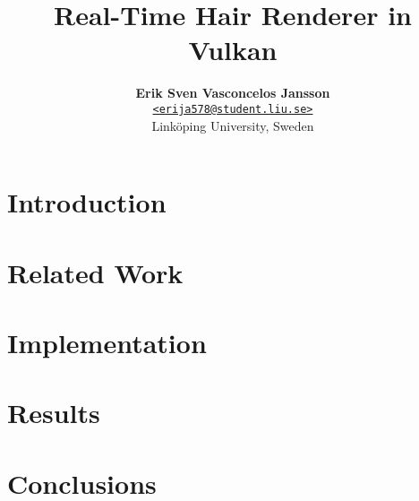 \documentclass[a4paper, twocolumn]{article}
\title{\vspace{-1.5em}\textbf{Real-Time Hair Renderer in Vulkan}}
\author{{\textbf{Erik Sven Vasconcelos Jansson}} \\
        {\href{mailto:erija578@student.liu.se}
        {\texttt{<erija578@student.liu.se>}}} \\
        {Linköping University, Sweden}}
\begin{document}
    \maketitle

    \begin{abstract}  \end{abstract} %
    \section{Introduction} \label{sec:introduction} 
    \section{Related Work} \label{sec:related_work} 
    \section{Implementation} \label{sec:implementation} 
    \section{Results} \label{sec:results} 
    \section{Conclusions} \label{sec:conclusions} 

    \nocite{*} %
    
    
    \appendix

    
\end{document}
